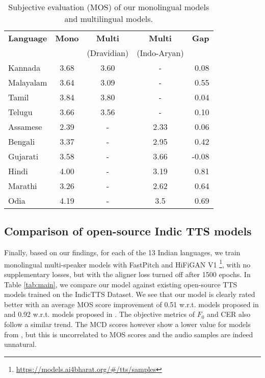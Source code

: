 \documentclass{article}
\begin{document}
\begin{table}[htbp]
\centering
\begingroup
\setlength{\tabcolsep}{6pt} \renewcommand{\arraystretch}{0.9} \begin{tabular}{lcccr}
\toprule
\textbf{Language} & \textbf{Mono} & \textbf{Multi} & \textbf{Multi} & \textbf{Gap} \\
&  & (Dravidian) & (Indo-Aryan) & \\ \midrule
Kannada   & 3.68 & 3.60  & -    & 0.08  \\
Malayalam & 3.64 & 3.09 & -    & 0.55  \\
Tamil     & 3.84 & 3.80  & -    & 0.04  \\
Telugu    & 3.66 & 3.56 & -    & 0.10   \\ \midrule
Assamese  & 2.39 & -    & 2.33 & 0.06  \\

Bengali   & 3.37 & -    & 2.95 & 0.42  \\
Gujarati  & 3.58 & -    & 3.66 & -0.08 \\
Hindi     & 4.00    & -    & 3.19 & 0.81  \\
Marathi   & 3.26 & -    & 2.62 & 0.64  \\
Odia      & 4.19 & -    & 3.5  & 0.69   \\ \bottomrule
\end{tabular}
\endgroup
\caption{Subjective evaluation (MOS) of our monolingual models and multilingual models.}
\label{tab:multilingual}
\end{table}

\subsection{Comparison of open-source Indic TTS models}
\label{subsec:best}
Finally, based on our findings, for each of the 13 Indian languages, we train monolingual multi-speaker models with FastPitch and HiFiGAN V1 \footnote{\scriptsize \url{https://models.ai4bharat.org/\#/tts/samples}}, with no supplementary losses, but with the aligner loss turned off after 1500 epochs. 
In Table \ref{tab:main}, we compare our model against existing open-source TTS models trained on the IndicTTS Dataset.
We see that our model is clearly rated better with an average MOS score improvement of 0.51 w.r.t. models proposed in \cite{prakash2020generic} and 0.92 w.r.t. models proposed in \cite{vakyansh2021glow}.
The objective metrics of $F_0$ and CER also follow a similar trend. 
The MCD scores however show a lower value for models from \cite{vakyansh2021glow}, but this is uncorrelated to MOS scores \cite{salesky2021assessing} and the audio samples are indeed unnatural.
\end{document}
